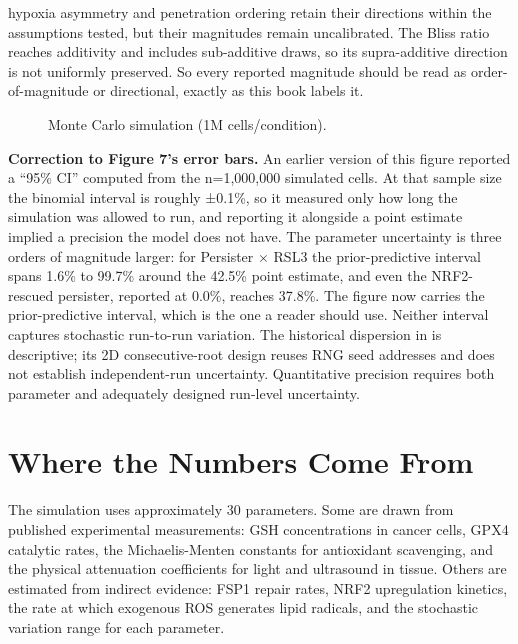 \documentclass[11pt,twoside,openright]{report}
\begin{document}
\begin{enumerate}
hypoxia asymmetry and penetration ordering retain their directions within the assumptions tested, but their magnitudes remain uncalibrated. The Bliss ratio reaches additivity and includes sub-additive draws, so its supra-additive direction is not uniformly preserved. So every reported magnitude should be read as order-of-magnitude or directional, exactly as this book labels it.
\end{enumerate}

\begin{figure}[tbp]
\setcounter{figure}{6}
\caption{Monte Carlo simulation (1M cells/condition).}
\label{fig:fig7_monte_carlo_simulation}
\end{figure}

\textbf{Correction to Figure 7's error bars.} An earlier version of this figure reported a ``95\% CI'' computed from the n=1,000,000 simulated cells. At that sample size the binomial interval is roughly ±0.1\%, so it measured only how long the simulation was allowed to run, and reporting it alongside a point estimate implied a precision the model does not have. The parameter uncertainty is three orders of magnitude larger: for Persister $\times$ RSL3 the prior-predictive interval spans 1.6\% to 99.7\% around the 42.5\% point estimate, and even the NRF2-rescued persister, reported at 0.0\%, reaches 37.8\%. The figure now carries the prior-predictive interval, which is the one a reader should use. Neither interval captures stochastic run-to-run variation. The historical dispersion in  is descriptive; its 2D consecutive-root design reuses RNG seed addresses and does not establish independent-run uncertainty. Quantitative precision requires both parameter and adequately designed run-level uncertainty.

\section{Where the Numbers Come From}

The simulation uses approximately 30 parameters. Some are drawn from published experimental measurements: GSH concentrations in cancer cells, GPX4 catalytic rates, the Michaelis-Menten constants for antioxidant scavenging, and the physical attenuation coefficients for light and ultrasound in tissue. Others are estimated from indirect evidence: FSP1 repair rates, NRF2 upregulation kinetics, the rate at which exogenous ROS generates lipid radicals, and the stochastic variation range for each parameter.
\end{document}

